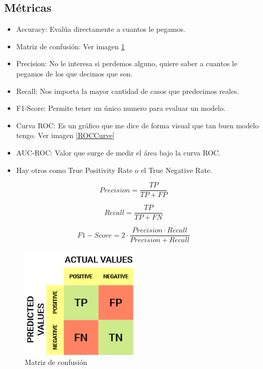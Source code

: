 \documentclass[titlepage,a4paper]{article}
\begin{document}
\subsection{Métricas}
\begin{itemize}
    \item Accuracy: Evalúa directamente a cuantos le pegamos.
    \item Matriz de confusión: Ver imagen \ref{MatrizDeConfusion}
    \item Precision: No le interesa si perdemos alguno, quiere saber a cuantos le pegamos de los que decimos que son. 
    \item Recall: Nos importa la mayor cantidad de casos que predecimos reales.
    \item F1-Score: Permite tener un único numero para evaluar un modelo.
    \item Curva ROC: Es un gráfico que me dice de forma visual que tan buen modelo tengo. Ver imagen \ref{ROCCurve}
    \item AUC-ROC: Valor que surge de medir el área bajo la curva ROC.
    \item Hay otros como True Positivity Rate o el True Negative Rate.
\end{itemize}

\begin{equation}
    Precision = \frac{TP}{TP+FP}
\end{equation}


\begin{equation}
    Recall = \frac{TP}{TP+FN}
\end{equation}

\begin{equation}
    F1-Score = 2 \cdot \frac{Precision \cdot Recall}{Precision + Recall}
\end{equation}

\begin{figure}[!htb]
    \centering
    \includegraphics[width=0.5\textwidth]{imagenesResumen/MatrizDeConfusion.png}
    \caption{Matriz de confusión}
    \label{MatrizDeConfusion}
\end{figure}
\end{document}
